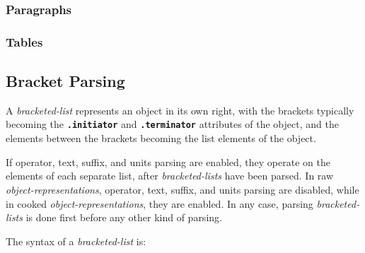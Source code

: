 \documentclass[12pt]{article}
\newcommand{\TT}[1]{{\tt \bfseries #1}}
\begin{document}
\subsubsection{Paragraphs}
\label{PARAGRAPHS}

\subsubsection{Tables}
\label{TABLES}

\subsection{Bracket Parsing}

A {\em bracketed-list} represents an object in its own right,
with the brackets typically
becoming the \TT{.initia\-tor} and \TT{.termina\-tor}
attributes of the object, and the elements between the brackets
becoming the list elements of the object.

If operator, text, suffix,
and units parsing are enabled, they operate on the elements of each
separate list, after {\em bracketed-lists} have been parsed.
In raw {\em object-representations}, operator, text, suffix, and
units parsing are disabled, while in cooked {\em object-representations},
they are enabled.  In any case, parsing {\em bracketed-lists} is done
first before any other kind of parsing.

The syntax of a {\em bracketed-list} is:
\end{document}
